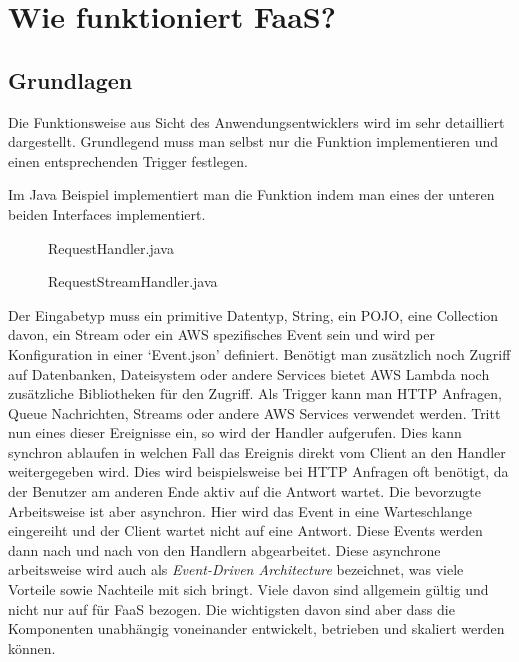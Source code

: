 \documentclass[12pt, a4paper]{article}
\begin{document}
\section{Wie funktioniert \ac{FaaS}?}
\subsection{Grundlagen}
Die Funktionsweise aus Sicht des Anwendungsentwicklers wird im \cite[Developer Guide von \ac{AWS}]{awsLambda_devGuide} sehr detailliert dargestellt.
Grundlegend muss man selbst nur die Funktion implementieren und einen entsprechenden Trigger festlegen.

Im Java Beispiel implementiert man die Funktion indem man eines der unteren beiden Interfaces implementiert.

\begin{figure}[h]
    
    \caption{RequestHandler.java}
\end{figure}

\begin{figure}[h]
    
    \caption{RequestStreamHandler.java}
\end{figure}

Der Eingabetyp muss ein primitive Datentyp, String, ein \ac{POJO}, eine Collection davon, ein Stream oder ein AWS spezifisches Event sein und wird per Konfiguration in einer `Event.json' definiert.
Benötigt man zusätzlich noch Zugriff auf Datenbanken, Dateisystem oder andere Services bietet \ac{AWS} Lambda noch zusätzliche Bibliotheken für den Zugriff.
\newline\newline
Als Trigger kann man HTTP Anfragen, Queue Nachrichten, Streams oder andere \ac{AWS} Services verwendet werden.
Tritt nun eines dieser Ereignisse ein, so wird der Handler aufgerufen.
Dies kann synchron ablaufen in welchen Fall das Ereignis direkt vom Client an den Handler weitergegeben wird.
Dies wird beispielsweise bei HTTP Anfragen oft benötigt, da der Benutzer am anderen Ende aktiv auf die Antwort wartet.
\newline
Die bevorzugte Arbeitsweise ist aber asynchron.
Hier wird das Event in eine Warteschlange eingereiht und der Client wartet nicht auf eine Antwort.
Diese Events werden dann nach und nach von den Handlern abgearbeitet.
Diese asynchrone arbeitsweise wird auch als \emph{Event-Driven Architecture} bezeichnet, was viele Vorteile sowie Nachteile mit sich bringt\cite{awsEventDrivenArchitecture}.
Viele davon sind allgemein gültig und nicht nur auf für \ac{FaaS} bezogen.
Die wichtigsten davon sind aber dass die Komponenten unabhängig voneinander entwickelt, betrieben und skaliert werden können.
\end{document}
